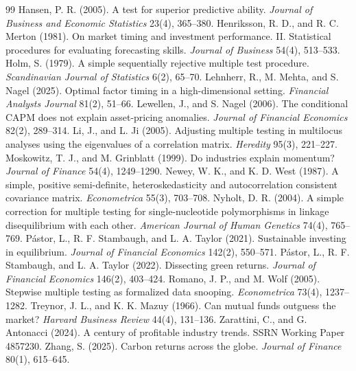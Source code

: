 \begin{thebibliography}{99}
 Hansen, P. R. (2005). A test for superior predictive ability. \textit{Journal of Business and Economic Statistics} 23(4), 365--380.
 Henriksson, R. D., and R. C. Merton (1981). On market timing and investment performance. II. Statistical procedures for evaluating forecasting skills. \textit{Journal of Business} 54(4), 513--533.
 Holm, S. (1979). A simple sequentially rejective multiple test procedure. \textit{Scandinavian Journal of Statistics} 6(2), 65--70.
 Lehnherr, R., M. Mehta, and S. Nagel (2025). Optimal factor timing in a high-dimensional setting. \textit{Financial Analysts Journal} 81(2), 51--66.
 Lewellen, J., and S. Nagel (2006). The conditional CAPM does not explain asset-pricing anomalies. \textit{Journal of Financial Economics} 82(2), 289--314.
 Li, J., and L. Ji (2005). Adjusting multiple testing in multilocus analyses using the eigenvalues of a correlation matrix. \textit{Heredity} 95(3), 221--227.
 Moskowitz, T. J., and M. Grinblatt (1999). Do industries explain momentum? \textit{Journal of Finance} 54(4), 1249--1290.
 Newey, W. K., and K. D. West (1987). A simple, positive semi-definite, heteroskedasticity and autocorrelation consistent covariance matrix. \textit{Econometrica} 55(3), 703--708.
 Nyholt, D. R. (2004). A simple correction for multiple testing for single-nucleotide polymorphisms in linkage disequilibrium with each other. \textit{American Journal of Human Genetics} 74(4), 765--769.
 P\'astor, L., R. F. Stambaugh, and L. A. Taylor (2021). Sustainable investing in equilibrium. \textit{Journal of Financial Economics} 142(2), 550--571.
 P\'astor, L., R. F. Stambaugh, and L. A. Taylor (2022). Dissecting green returns. \textit{Journal of Financial Economics} 146(2), 403--424.
 Romano, J. P., and M. Wolf (2005). Stepwise multiple testing as formalized data snooping. \textit{Econometrica} 73(4), 1237--1282.
 Treynor, J. L., and K. K. Mazuy (1966). Can mutual funds outguess the market? \textit{Harvard Business Review} 44(4), 131--136.
 Zarattini, C., and G. Antonacci (2024). A century of profitable industry trends. SSRN Working Paper 4857230.
 Zhang, S. (2025). Carbon returns across the globe. \textit{Journal of Finance} 80(1), 615--645.
\end{thebibliography}

